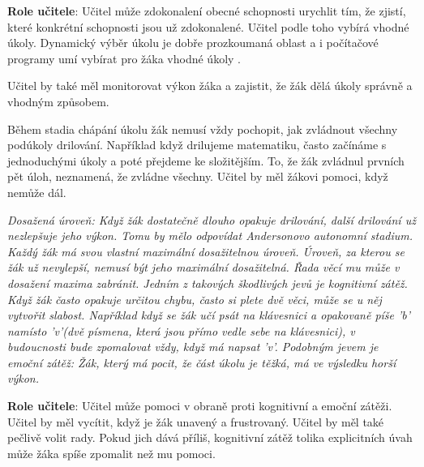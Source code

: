 {\bf Role učitele}: Učitel může zdokonalení obecné schopnosti urychlit tím, že zjistí, které konkrétní schopnosti jsou už zdokonalené.  Učitel podle toho vybírá vhodné úkoly.  Dynamický výběr úkolu je dobře prozkoumaná oblast \citep{hintzman1976repetition} a i počítačové programy umí vybírat pro žáka vhodné úkoly \citep{anki}.

Učitel by také měl monitorovat výkon žáka a zajistit, že žák dělá úkoly správně a vhodným způsobem.

Během stadia chápání úkolu žák nemusí vždy pochopit, jak zvládnout všechny podúkoly drilování.  Například když drilujeme matematiku, často začínáme s jednoduchými úkoly a poté přejdeme ke složitějším.  To, že žák zvládnul prvních pět úloh, neznamená, že zvládne všechny.  Učitel by měl žákovi pomoci, když nemůže dál.

\em Dosažená úroveň\em : Když žák dostatečně dlouho opakuje drilování, další drilování už nezlepšuje jeho výkon.  Tomu by mělo odpovídat Andersonovo autonomní stadium.  Každý žák má svou vlastní maximální dosažitelnou úroveň.  Úroveň, za kterou se žák už nevylepší, nemusí být jeho maximální dosažitelná.  Řada věcí mu může v dosažení maxima zabránit.  Jedním z takových škodlivých jevů je kognitivní zátěž. Když žák často opakuje určitou chybu, často si plete dvě věci, může se u něj vytvořit slabost. Například když se žák učí psát na klávesnici a opakovaně píše 'b' namísto 'v'(dvě písmena, která jsou přímo vedle sebe na klávesnici), v budoucnosti bude zpomalovat vždy, když má napsat 'v'. Podobným jevem je emoční zátěž: Žák, který má pocit, že část úkolu je těžká, má ve výsledku horší výkon.

{\bf Role učitele}: Učitel může pomoci v obraně proti kognitivní a emoční zátěži.  Učitel by měl vycítit, když je žák unavený a frustrovaný. Učitel by měl také pečlivě volit rady.  Pokud jich dává příliš, kognitivní zátěž tolika explicitních úvah může žáka spíše zpomalit než mu pomoci.
